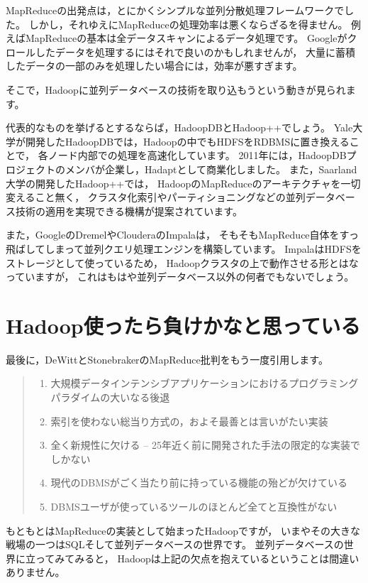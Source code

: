 MapReduceの出発点は，とにかくシンプルな並列分散処理フレームワークでした。
しかし，それゆえにMapReduceの処理効率は悪くならざるを得ません。
例えばMapReduceの基本は全データスキャンによるデータ処理です。
Googleがクロールしたデータを処理するにはそれで良いのかもしれませんが，
大量に蓄積したデータの一部のみを処理したい場合には，効率が悪すぎます。

そこで，Hadoopに並列データベースの技術を取り込もうという動きが見られます。

代表的なものを挙げるとするならば，HadoopDBとHadoop++でしょう。
Yale大学が開発したHadoopDBでは，Hadoopの中でもHDFSをRDBMSに置き換えることで，
各ノード内部での処理を高速化しています。
2011年には，HadoopDBプロジェクトのメンバが企業し，Hadaptとして商業化しました。
また，Saarland大学の開発したHadoop++では，
HadoopのMapReduceのアーキテクチャを一切変えること無く，
クラスタ化索引やパーティショニングなどの並列データベース技術の適用を実現できる機構が提案されています。

また，GoogleのDremelやClouderaのImpalaは，
そもそもMapReduce自体をすっ飛ばしてしまって並列クエリ処理エンジンを構築しています。
ImpalaはHDFSをストレージとして使っているため，
Hadoopクラスタの上で動作させる形とはなっていますが，
これはもはや並列データベース以外の何者でもないでしょう。

\section{Hadoop使ったら負けかなと思っている}

最後に，DeWittとStonebrakerのMapReduce批判をもう一度引用します。

\begin{quote}
\begin{enumerate}
 \item 大規模データインテンシブアプリケーションにおけるプログラミングパラダイムの大いなる後退
 \item 索引を使わない総当り方式の，およそ最善とは言いがたい実装
 \item 全く新規性に欠ける -- 25年近く前に開発された手法の限定的な実装でしかない
 \item 現代のDBMSがごく当たり前に持っている機能の殆どが欠けている
 \item DBMSユーザが使っているツールのほとんど全てと互換性がない
\end{enumerate}
\end{quote}

もともとはMapReduceの実装として始まったHadoopですが，
いまやその大きな戦場の一つはSQLそして並列データベースの世界です。
並列データベースの世界に立ってみてみると，
Hadoopは上記の欠点を抱えているということは間違いありません。


